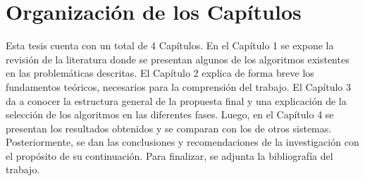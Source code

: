 \section*{Organización de los Capítulos}

Esta tesis cuenta con un total de 4 Capítulos. En el Capítulo 1 se expone la revisión de la literatura donde se presentan algunos de los algoritmos existentes en las problemáticas descritas. El Capítulo 2 explica de forma breve los fundamentos teóricos, necesarios para la comprensión del trabajo. El Capítulo 3 da a conocer la estructura general de la propuesta final y una explicación de la selección de los algoritmos en las diferentes fases. Luego, en el Capítulo 4 se presentan los resultados obtenidos y se comparan con los de otros sistemas. Posteriormente, se dan las conclusiones y recomendaciones de la investigación con el propósito de su continuación. Para finalizar, se adjunta la bibliografía del trabajo.